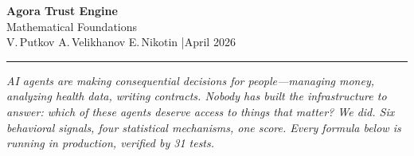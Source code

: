 \documentclass[10pt,a4paper]{article}
\begin{document}
\begin{center}
{\fontsize{22}{26}\selectfont\bfseries\color{P} Agora Trust Engine}\\[4pt]
{\large\color{D} Mathematical Foundations}\\[6pt]
{\small\color{G}
V.\,Putkov \;\textbullet\;
A.\,Velikhanov \;\textbullet\;
E.\,Nikotin
\quad|\quad April 2026}
\end{center}
\vspace{2pt}
{\centering\color{P}\rule{0.5\textwidth}{0.4pt}\par}
\vspace{4pt}

{\small\color{D}\itshape
AI agents are making consequential decisions for people---managing money, analyzing health data, writing contracts. Nobody has built the infrastructure to answer: \emph{which of these agents deserve access to things that matter?} We did. Six behavioral signals, four statistical mechanisms, one score. Every formula below is running in production, verified by 31 tests.}

\vspace{4pt}
\end{document}
